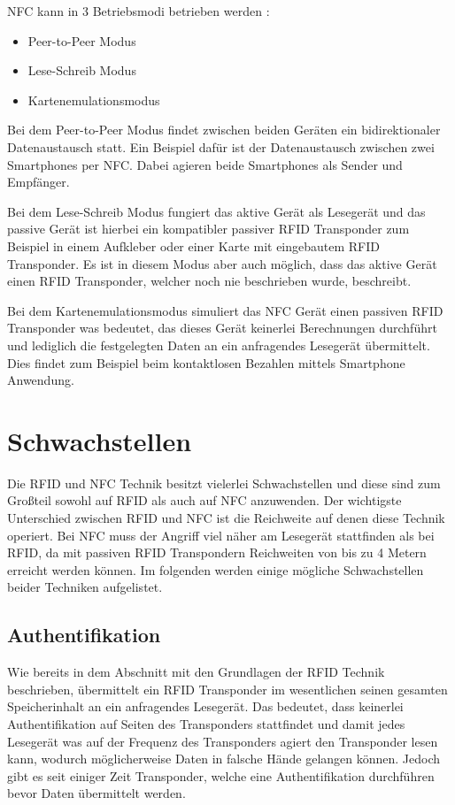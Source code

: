 \documentclass[conference]{IEEEtran}
\begin{document}
NFC kann in 3 Betriebsmodi betrieben werden \cite{b2}:

\begin{itemize}
\item Peer-to-Peer Modus
\item Lese-Schreib Modus
\item Kartenemulationsmodus
\end{itemize}

Bei dem Peer-to-Peer Modus findet zwischen beiden Geräten ein bidirektionaler Datenaustausch statt. Ein Beispiel dafür ist der Datenaustausch zwischen zwei Smartphones per NFC. Dabei agieren beide Smartphones als Sender und Empfänger.

Bei dem Lese-Schreib Modus fungiert das aktive Gerät als Lesegerät und das passive Gerät ist hierbei ein kompatibler passiver RFID Transponder zum Beispiel in einem Aufkleber oder einer Karte mit eingebautem RFID Transponder. Es ist in diesem Modus aber auch möglich, dass das aktive Gerät einen RFID Transponder, welcher noch nie beschrieben wurde, beschreibt.

Bei dem Kartenemulationsmodus simuliert das NFC Gerät einen passiven RFID Transponder was bedeutet, das dieses Gerät keinerlei Berechnungen durchführt und lediglich die festgelegten Daten an ein anfragendes Lesegerät übermittelt. Dies findet zum Beispiel beim kontaktlosen Bezahlen mittels Smartphone Anwendung.

\section{Schwachstellen}
Die RFID und NFC Technik besitzt vielerlei Schwachstellen und diese sind zum Großteil sowohl auf RFID als auch auf NFC anzuwenden. Der wichtigste Unterschied zwischen RFID und NFC ist die Reichweite auf denen diese Technik operiert. Bei NFC muss der Angriff viel näher am Lesegerät stattfinden als bei RFID, da mit passiven RFID Transpondern Reichweiten von bis zu 4 Metern erreicht werden können. Im folgenden werden einige mögliche Schwachstellen beider Techniken aufgelistet.

\subsection{Authentifikation}
Wie bereits in dem Abschnitt mit den Grundlagen der RFID Technik beschrieben, übermittelt ein RFID Transponder im wesentlichen seinen gesamten Speicherinhalt an ein anfragendes Lesegerät. Das bedeutet, dass keinerlei Authentifikation auf Seiten des Transponders stattfindet und damit jedes Lesegerät was auf der Frequenz des Transponders agiert den Transponder lesen kann, wodurch möglicherweise Daten in falsche Hände gelangen können. Jedoch gibt es seit einiger Zeit Transponder, welche eine Authentifikation durchführen bevor Daten übermittelt werden.
\end{document}
